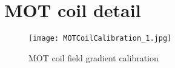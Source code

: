 \chapter{MOT coil detail} \label{app:motwrap}

	\begin{figure}
		\centerline{
		\texttt{[image: MOTCoilCalibration\_1.jpg]}}
		\caption{MOT coil field gradient calibration}
	\end{figure}